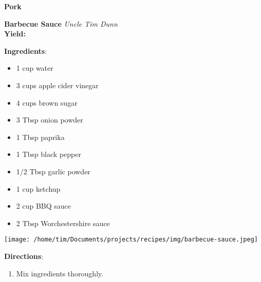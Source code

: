 \documentclass[11pt, twoside, openany]{book}
\begin{document}
{\newpage \LARGE \textbf{Pork}} \label{pork}\vspace{4mm}\\
\noindent\begin{minipage}[t]{\linewidth}%
{\Large\textbf{Barbecue Sauce}} \label{barbecue-sauce}\hfill\textit{Uncle Tim Dunn}\\
\textbf{Yield:} \textit{}\\
\noindent\begin{minipage}[t]{0.78\linewidth}%
\textbf{Ingredients}:\vspace{-3mm}
\begin{multicols}{2}
\begin{itemize}\setlength\itemsep{-1mm}
\item 1 cup water
\item 3 cups apple cider vinegar
\item 4 cups brown sugar
\item 3 Tbsp onion powder
\item 1 Tbsp paprika
\item 1 Tbsp black pepper
\item 1/2 Tbsp garlic powder
\item 1 cup ketchup
\item 2 cup BBQ sauce
\item 2 Tbsp Worchestershire sauce
\end{itemize}
\end{multicols}
\end{minipage}
\noindent\begin{minipage}[t]{0.18\linewidth}
\centering \strut\vspace*{-\baselineskip}\newline
\texttt{[image: /home/tim/Documents/projects/recipes/img/barbecue-sauce.jpeg]}\\
\end{minipage}\vspace{3mm}
\textbf{Directions}:
\vspace{-3mm}\begin{enumerate}\setlength\itemsep{-1mm}
\item Mix ingredients thoroughly.
\end{enumerate}
\end{minipage}\vspace{8mm}
\end{document}
